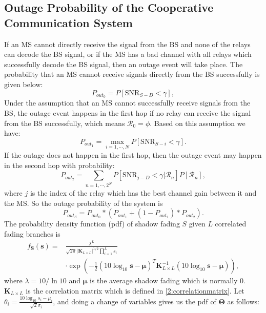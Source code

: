 \subsection{Outage Probability of the Cooperative Communication System}
\label{outageprobability}
 If an MS cannot directly receive the signal from the BS and none of the relays can decode the BS signal, or if the MS has a bad channel with all relays which successfully decode the BS signal, then an outage event will take place. The probability that an MS cannot receive signals directly from the BS successfully is given below:
\begin{equation}
P_{out_{0}} = P[\text{SNR}_{S-D}<\gamma],
\end{equation}
Under the assumption that an MS cannot successfully receive signals from the BS, the outage event happens in the first hop if no relay can receive the signal from the BS successfully, which means $\mathcal{R}_{0}=\phi$. Based on this assumption we have:
\begin{equation}
P_{out_{1}} = \max_{i = 1,\cdots,N} P[\text{SNR}_{S-i}<\gamma].
\end{equation}
If the outage does not happen in the first hop, then the outage event may happen in the second hop with probability:
\begin{equation}
P_{out_{2}} = \sum_{n=1,\cdots,2^{N}}P[\text{SNR}_{j-D}<\gamma|\mathcal{R}_{n}]P[\mathcal{R}_{n}],
\end{equation}
where $j$ is the index of the relay which has the best channel gain between it and the MS.
So the outage probability of the system is
\begin{equation}
P_{out_{S}} = P_{out_{0}}*(P_{out_{1}}+(1-P_{out_{1}})*P_{out_{2}}).
\end{equation}
The probability density function (pdf) of shadow fading $S$ given $L$ correlated fading branches is
\begin{equation}
\begin{split}
f_{\mathbf{S}}(\mathbf{s}) = &\frac{\lambda^{L}}{\sqrt{2\pi}|\mathbf{K}_{L\times L}|^{1/2}\prod_{i=1}^{L}s_{i}}\\
&\cdot\exp(-\frac{1}{2}(10\log_{10}\mathbf{s}-\boldsymbol{\mu})^{T}\mathbf{K}_{L\times L}^{-1}(10\log_{10}\mathbf{s}-\boldsymbol{\mu})),
\end{split}
\end{equation}
where $\lambda = 10/\ln10$ and $\boldsymbol{\mu}$ is the average shadow fading which is normally $0$. $\mathbf{K}_{L\times L}$ is the correlation matrix which is defined in \eqref{2:correlationmatrix}. Let $\theta_{i} = \frac{10\log_{10}s_{i}-\mu_{i}}{\sqrt{2}\sigma_{i}}$, and doing a change of variables gives us the pdf of $\mathbf{\Theta}$ as follows:
